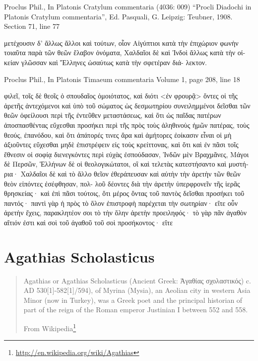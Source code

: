 \documentclass[12pt,letterpaper,twoside,final]{memoir}
\begin{document}
\begin{greek}

Proclus Phil., In Platonis Cratylum commentaria (4036: 009)
“Procli Diadochi in Platonis Cratylum commentaria”, Ed. Pasquali, G.
Leipzig: Teubner, 1908.
Section 71, line 77

                    μετέχουσιν δ' ἄλλως ἄλλοι καὶ τούτων, οἷον 
Αἰγύπτιοι κατὰ τὴν ἐπιχώριον φωνὴν τοιαῦτα παρὰ τῶν θεῶν 
ἔλαβον ὀνόματα, Χαλδαῖοι δὲ καὶ Ἰνδοὶ ἄλλως κατὰ τὴν οἰ-
κείαν γλῶσσαν καὶ Ἕλληνες ὡσαύτως κατὰ τὴν σφετέραν διά-
λεκτον. 

Proclus Phil., In Platonis Timaeum commentaria 
Volume 1, page 208, line 18

φιλεῖ, τοῖς δὲ θεοῖς ὁ σπουδαῖος ὁμοιότατος, καὶ διότι <ἐν 
φρουρᾷ> ὄντες οἱ τῆς ἀρετῆς ἀντεχόμενοι καὶ ὑπὸ τοῦ 
σώματος ὡς δεσμωτηρίου συνειλημμένοι δεῖσθαι τῶν θεῶν 
ὀφείλουσι περὶ τῆς ἐντεῦθεν μεταστάσεως, καὶ ὅτι ὡς παῖδας 
πατέρων ἀποσπασθέντας εὔχεσθαι προσήκει περὶ τῆς πρὸς 
τοὺς ἀληθινοὺς ἡμῶν πατέρας, τοὺς θεούς, ἐπανόδου, καὶ 
ὅτι ἀπάτορές τινες ἄρα καὶ ἀμήτορες ἐοίκασιν εἶναι οἱ μὴ 
ἀξιοῦντες εὔχεσθαι μηδὲ ἐπιστρέφειν εἰς τοὺς κρείττονας, καὶ 
ὅτι καὶ ἐν πᾶσι τοῖς ἔθνεσιν οἱ σοφίᾳ διενεγκόντες περὶ 
εὐχὰς ἐσπούδασαν, Ἰνδῶν μὲν Βραχμᾶνες, Μάγοι δὲ Περσῶν, 
Ἑλλήνων δὲ οἱ θεολογικώτατοι, οἳ καὶ τελετὰς κατεστήσαντο 
καὶ μυστήρια· Χαλδαῖοι δὲ καὶ τὸ ἄλλο θεῖον ἐθεράπευσαν καὶ 
αὐτὴν τὴν ἀρετὴν τῶν θεῶν θεὸν εἰπόντες ἐσέφθησαν, πολ-
λοῦ δέοντες διὰ τὴν ἀρετὴν ὑπερφρονεῖν τῆς ἱερᾶς θρησκείας· 
καὶ ἐπὶ πᾶσι τούτοις, ὅτι μέρος ὄντας τοῦ παντὸς δεῖσθαι 
προσήκει τοῦ παντός· παντὶ γὰρ ἡ πρὸς τὸ ὅλον ἐπιστροφὴ 
παρέχεται τὴν σωτηρίαν· εἴτε οὖν ἀρετὴν ἔχεις, παρακλητέον 
σοι τὸ τὴν ὅλην ἀρετὴν προειληφός· τὸ γὰρ πᾶν ἀγαθὸν 
αἴτιόν ἐστι καὶ σοὶ τοῦ ἀγαθοῦ τοῦ σοὶ προσήκοντος· εἴτε 

\end{greek}




\section{Agathias Scholasticus}

\blockquote[From Wikipedia\footnote{\url{http://en.wikipedia.org/wiki/Agathias}}]{Agathias or Agathias Scholasticus (Ancient Greek: Ἀγαθίας σχολαστικός) c. AD 530[1]-582[1]/594), of Myrina (Mysia), an Aeolian city in western Asia Minor (now in Turkey), was a Greek poet and the principal historian of part of the reign of the Roman emperor Justinian I between 552 and 558.}
\end{document}
